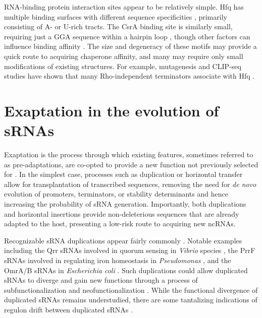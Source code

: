 RNA-binding protein interaction sites appear to be relatively simple. Hfq has multiple binding surfaces with different sequence specificities \citep{Santiago-Frangos2018-xw}, primarily consisting of A- or U-rich tracts. The CsrA binding site is similarly small, requiring just a GGA sequence within a hairpin loop \citep{Romeo2018-wb}, though other factors can influence binding affinity \citep{Duss2014-lf}. The size and degeneracy of these motifs may provide a quick route to acquiring chaperone affinity, and many may require only small modifications of existing structures. For example, mutagenesis and CLIP-seq studies have shown that many Rho-independent terminators associate with Hfq \citep{Otaka2011-yc,Holmqvist2016-hj}. 

\section{Exaptation in the evolution of sRNAs}

Exaptation is the process through which existing features, sometimes referred to as pre-adaptations, are co-opted to provide a new function not previously selected for \citep{Gould1982-xk}. In the simplest case, processes such as duplication or horizontal transfer allow for transplantation of transcribed sequences, removing the need for \textit{de novo} evolution of promoters, terminators, or stability determinants and hence increasing the probability of sRNA generation. Importantly, both duplications and horizontal insertions provide non-deleterious sequences that are already adapted to the host, presenting a low-risk route to acquiring new ncRNAs. \par

Recognizable sRNA duplications appear fairly commonly \citep{Caswell2014-pk}. Notable examples including the Qrr sRNAs involved in quorum sensing in \textit{Vibrio} species \citep{Papenfort2016-mc}, the PrrF sRNAs involved in regulating iron homeostasis in \textit{Pseudomonas} \citep{Wilderman2004-le}, and the OmrA/B sRNAs in \textit{Escherichia coli} \citep{Holmqvist2010-lc}. Such duplications could allow duplicated sRNAs to diverge and gain new functions through a process of subfunctionalization and neofunctionalization \citep{Rastogi2005-hn}. While the functional divergence of duplicated sRNAs remains understudied, there are some tantalizing indications of regulon drift between duplicated sRNAs \citep{Caswell2014-pk}.\par 

